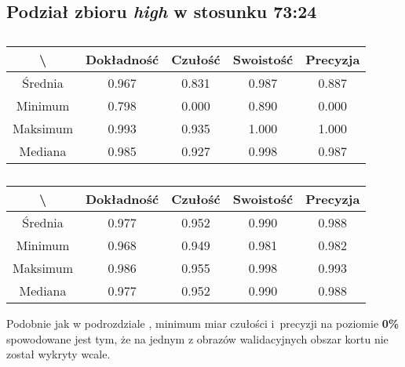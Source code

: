 \subsection{Podział zbioru \textit{high} w stosunku 73:24}
\label{sec:highsplitc}


\begin{table}[H]
	\centering
	\caption{}
	\vspace{6pt}
	{\footnotesize
		\begin{tabular}{|c|c|c|c|c|}
      \hline \textbackslash & Dokładność & Czułość & Swoistość & Precyzja \\
      \hline Średnia & 0.967 & 0.831 & 0.987 & 0.887 \\
      \hline Minimum & 0.798 & 0.000 & 0.890 & 0.000 \\
      \hline Maksimum & 0.993 & 0.935 & 1.000 & 1.000 \\
      \hline Mediana & 0.985 & 0.927 & 0.998 & 0.987 \\
      \hline
    \end{tabular}
    \label{Tab:highsplitc_val}
	}
	\vspace{0pt}
\end{table}

\begin{table}[H]
	\centering
	\caption{}
	\vspace{6pt}
	{\footnotesize
		\begin{tabular}{|c|c|c|c|c|}
      \hline \textbackslash & Dokładność & Czułość & Swoistość & Precyzja \\
      \hline Średnia & 0.977 & 0.952 & 0.990 & 0.988 \\
      \hline Minimum & 0.968 & 0.949 & 0.981 & 0.982 \\
      \hline Maksimum & 0.986 & 0.955 & 0.998 & 0.993 \\
      \hline Mediana & 0.977 & 0.952 & 0.990 & 0.988 \\
      \hline
    \end{tabular}
    \label{Tab:highsplitc_test}
	}
	\vspace{0pt}
\end{table}

Podobnie jak w podrozdziale , minimum miar czułości i~precyzji na poziomie \textbf{0\%} spowodowane jest tym, że na jednym z obrazów walidacyjnych obszar kortu nie został wykryty wcale.
